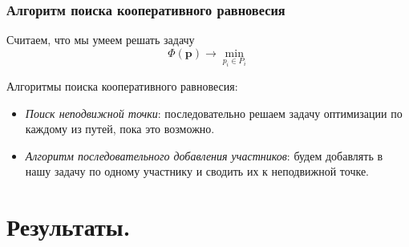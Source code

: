 \documentclass{beamer}
\begin{document}
\begin{frame}\frametitle{Алгоритм поиска кооперативного равновесия}
	Считаем, что мы умеем решать задачу 
	$$\Phi (\textbf{p}) \rightarrow \min\limits_{p_i \in P_i}$$
	
	Алгоритмы поиска кооперативного равновесия:
	\begin{itemize}
		\item \textit{Поиск неподвижной точки}: последовательно решаем задачу оптимизации по каждому из путей, пока это возможно. 
		\item  \textit{Алгоритм последовательного добавления участников}: будем добавлять в нашу задачу по одному участнику и сводить их к неподвижной точке.
	\end{itemize}
\end{frame}

\section{Результаты. }
\end{document}
